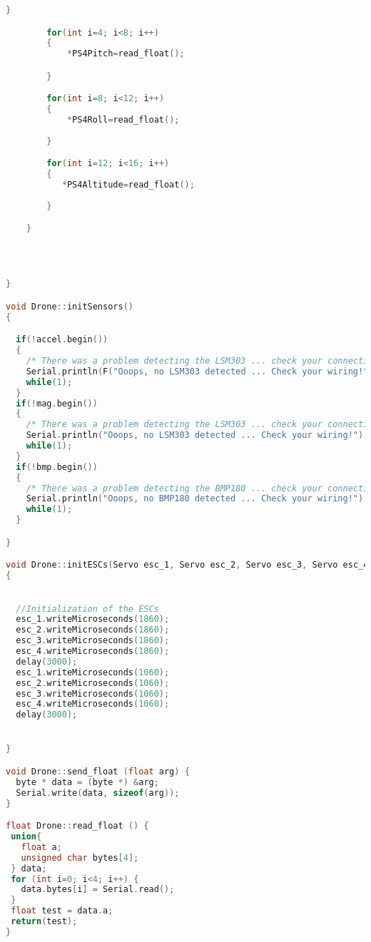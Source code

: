 \begin{lstlisting}[language=C,caption={Drone.cpp Arduino Library File},label={lst:Drone.cpp}]
        }

        for(int i=4; i<8; i++)
        {
            *PS4Pitch=read_float();

        }

        for(int i=8; i<12; i++)
        {
            *PS4Roll=read_float();
            
        }

        for(int i=12; i<16; i++)
        {
           *PS4Altitude=read_float();
            
        }

    }
    
    


}

void Drone::initSensors()
{

  if(!accel.begin())
  {
    /* There was a problem detecting the LSM303 ... check your connections */
    Serial.println(F("Ooops, no LSM303 detected ... Check your wiring!"));
    while(1);
  }
  if(!mag.begin())
  {
    /* There was a problem detecting the LSM303 ... check your connections */
    Serial.println("Ooops, no LSM303 detected ... Check your wiring!");
    while(1);
  }
  if(!bmp.begin())
  {
    /* There was a problem detecting the BMP180 ... check your connections */
    Serial.println("Ooops, no BMP180 detected ... Check your wiring!");
    while(1);
  }

}

void Drone::initESCs(Servo esc_1, Servo esc_2, Servo esc_3, Servo esc_4)
{
    

  //Initialization of the ESCs
  esc_1.writeMicroseconds(1860);
  esc_2.writeMicroseconds(1860);
  esc_3.writeMicroseconds(1860);
  esc_4.writeMicroseconds(1860);
  delay(3000);
  esc_1.writeMicroseconds(1060);
  esc_2.writeMicroseconds(1060);
  esc_3.writeMicroseconds(1060);
  esc_4.writeMicroseconds(1060);
  delay(3000);


}

void Drone::send_float (float arg) {
  byte * data = (byte *) &arg;
  Serial.write(data, sizeof(arg));
}

float Drone::read_float () {
 union{
   float a;
   unsigned char bytes[4];
 } data;
 for (int i=0; i<4; i++) {
   data.bytes[i] = Serial.read();
 }
 float test = data.a;
 return(test);
}



\end{lstlisting}



\newpage

